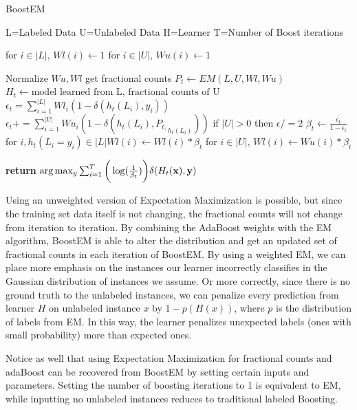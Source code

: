 \documentclass{sig-alternate}
\begin{document}
\begin{algorithm}
\caption{BoostEM}\label{euclid}
\begin{algorithmic}[1]
\State L=Labeled Data
\State U=Unlabeled Data
\State H=Learner
\State T=Number of Boost iterations

\State for $i \in |L|$, $ Wl(i) \gets 1$
\State for $i \in |U|$, $ Wu(i) \gets 1$

\State Normalize $Wu,Wl$
\State get fractional counts $P_{t} \gets EM(L,U,Wl,Wu)$
\State $H_{t} \gets \text{model learned from L, fractional counts of U}$
\State $\epsilon_{t} = \sum_{i=1}^{|L|} Wl_{i}(1-\delta(h_{t}(L_{i}),y_{i}))$
\State $\epsilon_{t} += \sum_{i=1}^{|U|} Wu_{i}(1-\delta(h_{t}(L_{i}),{P_{t,}}_{h_{t}(L_{i})}))$
\State if $|U| > 0$ then $\epsilon /= 2$
\State $\beta_{t} \gets \frac{\epsilon_{t}}{1-\epsilon_{t}}$
\State for $i,h_{t}(L_{i} = y_{i}) \in |L| Wl(i) \gets Wl(i)*\beta_{t}$
\State for $i \in |U|$, $Wl(i) \gets Wu(i)*\beta_{t}$

\EndFor
\State \textbf{return} $\arg \max_{y} \sum_{i=1}^{T}\bigg(\log(\frac{1}{\beta_{t}})\bigg) \delta(H_{t}(\bf{x}),y)$
\EndProcedure
\end{algorithmic}
\end{algorithm}


 Using an unweighted version of Expectation Maximization is possible, but since the training set data itself is not changing, the fractional counts will not change from iteration to iteration. By combining the AdaBoost weights with the EM algorithm, BoostEM is able to alter the distribution and get an updated set of fractional counts in each iteration of BoostEM.   By using a weighted EM, we can place more emphasis on the instances our learner incorrectly classifies in the Gaussian distribution of instances we assume. Or more correctly, since there is no ground truth to the unlabeled instances, we can penalize every prediction from learner $H$ on unlabeled instance $x$ by $1-p(H(x))$, where $p$ is the distribution of labels from EM.  In this way, the learner penalizes unexpected labels (ones with small probability) more than expected ones.



Notice as well that using Expectation Maximization for fractional counts and adaBoost can be recovered from BoostEM by setting certain inputs and parameters.  Setting the number of boosting iterations to 1 is equivalent to EM, while inputting no unlabeled instances reduces to traditional labeled Boosting.    
    
\end{document}
